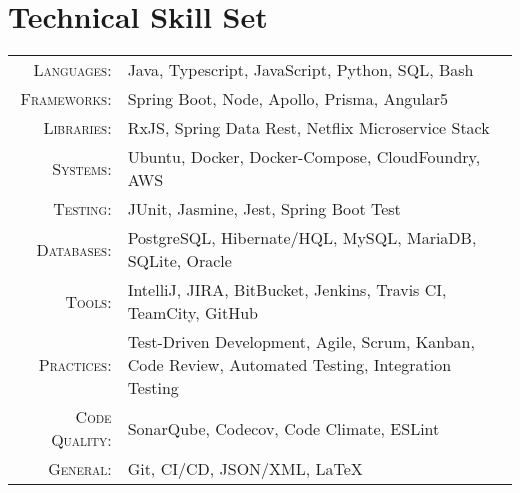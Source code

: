 \section{Technical Skill Set}\label{sec:technical-skill-set}
\begin{tabular}{r|p{11cm}}
    \textsc{Languages}: & Java, Typescript, JavaScript, Python, SQL, Bash \\
    \textsc{Frameworks}: & Spring Boot, Node, Apollo, Prisma, Angular5 \\
    \textsc{Libraries}: & RxJS, Spring Data Rest, Netflix Microservice Stack \\
    \textsc{Systems}: & Ubuntu, Docker, Docker-Compose, CloudFoundry, AWS \\
    \textsc{Testing}: & JUnit, Jasmine, Jest, Spring Boot Test \\
    \textsc{Databases}: & PostgreSQL, Hibernate/HQL, MySQL, MariaDB, SQLite, Oracle \\
    \textsc{Tools}: & IntelliJ, JIRA, BitBucket, Jenkins, Travis CI, TeamCity, GitHub \\
    \textsc{Practices}: & Test-Driven Development, Agile, Scrum, Kanban, Code Review, Automated Testing, Integration Testing     \\
    \textsc{Code Quality}: & SonarQube, Codecov, Code Climate, ESLint \\
    \textsc{General}: & Git, CI/CD, JSON/XML, LaTeX  \\
\end{tabular}